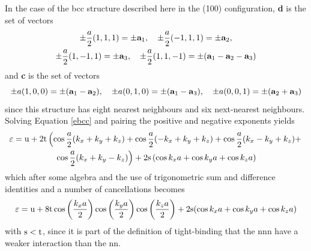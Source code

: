 \documentclass[a4paper, 12pt]{article}
\begin{document}
		In the case of the \gls{bcc} structure described here in the (100) configuration, {\bf d} is the set of vectors\\ 
		\begin{gather*}
			\pm \frac{a}{2}(1,1,1) = \pm {\bf a}_1,\quad \pm\frac{a}{2}(-1,1,1)=\pm {\bf a}_2,\\\pm \frac{a}{2}(1,-1,1)=\pm {\bf a}_3,\quad \pm \frac{a}{2}(1,1,-1)=\pm({\bf a}_1-{\bf a}_2-{\bf a}_3)
		\end{gather*}
		and {\bf c} is the set of vectors 
		\begin{equation*}
			\pm a(1,0,0) = \pm ({\bf a}_1-{\bf a}_2), \quad\pm a(0,1,0)=\pm ({\bf a}_1-{\bf a}_3), \quad\pm a(0,0,1) =\pm ({\bf a}_2+{\bf a}_3)
		\end{equation*}
		since this structure has eight nearest neighbours and six next-nearest neighbours.
		Solving Equation \eqref{ebcc} and pairing the positive and negative exponents yields 
		\begin{multline}
			\varepsilon = {\rm u} + 2{\rm t}\left(\cos\frac{a}{2}(k_x+k_y+k_z)+\cos\frac{a}{2}(-k_x+k_y+k_z)+\cos\frac{a}{2}(k_x-k_y+k_z) + \right.\\\left.\cos\frac{a}{2}(k_x+k_y-k_z)\right)+2{\rm s}\left(\cos k_x a+\cos k_y a+\cos k_z a \right)
		\end{multline}
		which after some algebra and the use of trigonometric sum and difference identities and a number of cancellations becomes
		\begin{equation}
			\varepsilon={\rm u} + 8{\rm t}\cos\left(\frac{k_x a}{2}\right)\cos\left(\frac{k_y a}{2}\right)\cos\left(\frac{k_z a}{2}\right) + 2{\rm s}(\cos k_x a + \cos k_y a + \cos k_z a)
		\end{equation}
		with $\rm s<t$, since it is part of the definition of tight-binding that the \gls{nnn} have a weaker interaction than the \gls{nn}.
\end{document}
